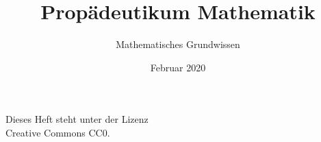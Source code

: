\documentclass[a4paper,11pt,fleqn,twocolumn,twoside,dvipdfmx]{scrbook}
\title{Propädeutikum Mathematik}
\subtitle{Mathematisches Grundwissen}
\author{}
\date{Februar 2020}
\begin{document}
\maketitle
\clearpage

\noindent
Dieses Heft steht unter der Lizenz\\
Creative Commons CC0.

\tableofcontents


\end{document}
